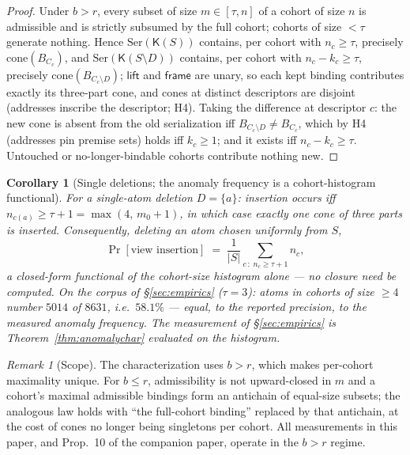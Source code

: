 \documentclass[11pt]{article}
\newtheorem{corollary}[theorem]{Corollary}
\theoremstyle{definition}
\theoremstyle{remark}
\newtheorem{remark}[theorem]{Remark}
\newcommand{\K}{\mathsf{K}}
\newcommand{\diffop}{\setminus}
\begin{document}
\begin{proof}
Under $b > r$, every subset of size $m \in [\tau, n]$ of a cohort of
size $n$ is admissible and is strictly subsumed by the full cohort;
cohorts of size $< \tau$ generate nothing. Hence
$\mathrm{Ser}(\K(S))$ contains, per cohort with $n_c \ge \tau$,
precisely $\mathrm{cone}(B_{C_c})$, and
$\mathrm{Ser}(\K(S \diffop D))$ contains, per cohort with
$n_c - k_c \ge \tau$, precisely $\mathrm{cone}(B_{C_c \diffop D})$;
$\mathsf{lift}$ and $\mathsf{frame}$ are unary, so each kept binding
contributes exactly its three-part cone, and cones at distinct
descriptors are disjoint (addresses inscribe the descriptor; H4).
Taking the difference at descriptor $c$: the new cone is absent from
the old serialization iff $B_{C_c \diffop D} \neq B_{C_c}$, which by
H4 (addresses pin premise sets) holds iff $k_c \ge 1$; and it exists
iff $n_c - k_c \ge \tau$. Untouched or no-longer-bindable cohorts
contribute nothing new.
\end{proof}

\begin{corollary}[Single deletions; the anomaly frequency is a
cohort-histogram functional]\label{cor:frequency}
For a single-atom deletion $D = \{a\}$: insertion occurs iff
$n_{c(a)} \ge \tau + 1 = \max(4,\, m_0 + 1)$, in which case exactly one
cone of three parts is inserted. Consequently, deleting an atom chosen
uniformly from $S$,
\[
\Pr[\text{view insertion}]
\;=\;
\frac{1}{|S|} \sum_{c \,:\; n_c \ge \tau + 1} n_c ,
\]
a closed-form functional of the cohort-size histogram alone --- no
closure need be computed. On the corpus of
\S\ref{sec:empirics} ($\tau = 3$): atoms in cohorts of size $\ge 4$
number $5014$ of $8631$, i.e.\ $58.1\%$ --- equal, to the reported
precision, to the measured anomaly frequency. The measurement of
\S\ref{sec:empirics} is Theorem~\ref{thm:anomalychar} evaluated on the
histogram.
\end{corollary}

\begin{remark}[Scope]\label{rem:anomalyscope}
The characterization uses $b > r$, which makes per-cohort maximality
unique. For $b \le r$, admissibility is not upward-closed in $m$ and a
cohort's maximal admissible bindings form an antichain of equal-size
subsets; the analogous law holds with ``the full-cohort binding''
replaced by that antichain, at the cost of cones no longer being
singletons per cohort. All measurements in this paper, and Prop.~10 of
the companion paper, operate in the $b > r$ regime.
\end{remark}
\end{document}
